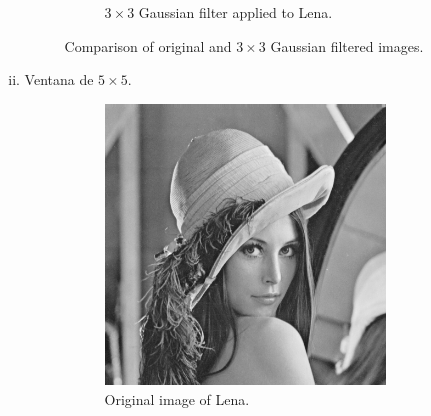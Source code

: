 \documentclass{article}
\theoremstyle{problemstyle}
\begin{document}
\begin{problem}
\begin{enumerate}[a)]
\begin{enumerate}[i)]
\begin{figure}[H]
\begin{subfigure}{.45\textwidth}
				            \caption{$ 3\times 3 $ Gaussian filter applied to Lena.}
				            \label{fig:lena_Gaussian_3x3}
			            \end{subfigure}
			            \caption{Comparison of original and $ 3\times 3 $ Gaussian filtered images.}
		            \end{figure}
		      \item Ventana de $ 5\times 5 $.
		            \begin{figure}[H]
			            \begin{subfigure}{.45\textwidth}
				            \centering
				            \includegraphics[width=0.95\textwidth]{lena_ascii.png}
				            \caption{Original image of Lena.}
			            \end{subfigure}
			            \hfill
			            \begin{subfigure}{.45\textwidth}
				            \centering

\end{subfigure}
\end{figure}
\end{enumerate}
\end{enumerate}
\end{problem}
\end{document}
